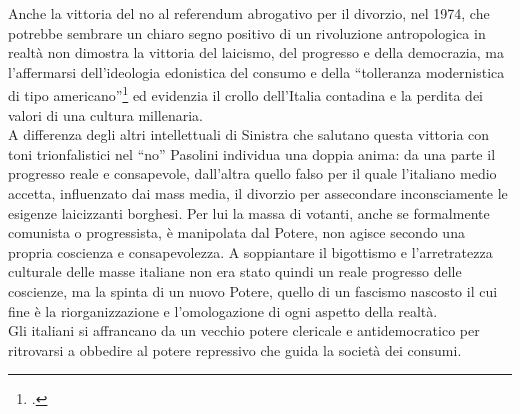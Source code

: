 Anche la vittoria del no al referendum abrogativo per il divorzio, nel 1974, che potrebbe sembrare un chiaro segno positivo di un rivoluzione antropologica in realtà non dimostra la vittoria del laicismo, del progresso e della democrazia, ma l'affermarsi dell'ideologia edonistica del consumo e della \enquote{tolleranza modernistica di tipo americano}\footcite{Scritti3} ed evidenzia il crollo dell'Italia contadina e la perdita dei valori di una cultura millenaria.
\\A differenza degli altri intellettuali di Sinistra che salutano questa vittoria con toni trionfalistici nel \enquote{no} Pasolini individua una doppia anima: da una parte il progresso reale e consapevole, dall'altra quello falso per il quale l'italiano medio accetta, influenzato dai mass media, il divorzio per assecondare inconsciamente le esigenze laicizzanti borghesi.
Per lui la massa di votanti, anche se formalmente comunista o progressista, è manipolata dal Potere, non agisce secondo una propria coscienza e consapevolezza.
A soppiantare il bigottismo e l'arretratezza culturale delle masse italiane non era stato quindi un reale progresso delle coscienze, ma la spinta di un nuovo Potere, quello di un fascismo nascosto il cui fine è la riorganizzazione e l'omologazione di ogni aspetto della realtà.
\\Gli italiani si affrancano da un vecchio potere clericale e antidemocratico per ritrovarsi a obbedire al potere repressivo che guida la società dei consumi.

